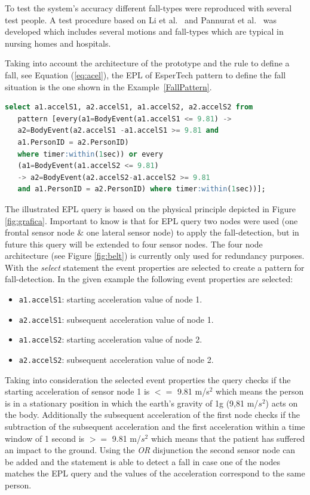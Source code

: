 \documentclass[review]{elsarticle}
\begin{document}
To test the system's accuracy different fall-types were reproduced with several test people. A 
test procedure based on Li et al.~\cite{Li2009} and Pannurat et al.~\cite{Pannurat2014} was developed which includes 
several motions and fall-types which are typical in nursing homes and hospitals.

Taking into account the architecture of the prototype and the rule to define a fall, see Equation (\ref{eq:acel}), 
the EPL of EsperTech pattern to define the fall situation is the one shown in the Example~\ref{FallPattern}.

\begin{lstlisting}[basicstyle=\ttfamily\footnotesize,language=SQL,caption=Fall pattern,label=FallPattern]
  select a1.accelS1, a2.accelS1, a1.accelS2, a2.accelS2 from 
   pattern [every(a1=BodyEvent(a1.accelS1 <= 9.81) -> 
   a2=BodyEvent(a2.accelS1 -a1.accelS1 >= 9.81 and 
   a1.PersonID = a2.PersonID) 
   where timer:within(1sec)) or every 
   (a1=BodyEvent(a1.accelS2 <= 9.81)
   -> a2=BodyEvent(a2.accelS2-a1.accelS2 >= 9.81
   and a1.PersonID = a2.PersonID) where timer:within(1sec))];
 \end{lstlisting}

The illustrated EPL query is based on the physical principle depicted in 
Figure \ref{fig:grafica}. Important to know is that for EPL query two nodes 
were used (one frontal sensor node \& one lateral sensor node) to apply the 
fall-detection, but in future this query will be extended to four sensor nodes. 
The four node architecture (see Figure \ref{fig:belt}) is currently only used 
for redundancy purposes. With the \textit{select} statement the event properties 
are selected to create a pattern for fall-detection. In the given example the
following event properties are selected:

\begin{itemize}
 \item \texttt{a1.accelS1}: starting acceleration value of node 1.
 \item \texttt{a2.accelS1}: subsequent acceleration value of node 1.
 \item \texttt{a1.accelS2}: starting acceleration value of node 2.
 \item \texttt{a2.accelS2}: subsequent acceleration value of node 2.
\end{itemize}

Taking into consideration the selected event properties the query checks if the 
starting acceleration of sensor node 1 is $<=$ 9.81 m/s$^2$ which means the person 
is in a stationary position in which the earth's gravity of 1g (9,81 m/$s^2$) acts 
on the body. Additionally the subsequent acceleration of the first node checks if the 
subtraction of the subsequent acceleration and the first acceleration within a 
time window of 1 second is $>=$ 9.81 m/$s^2$ which means that the patient has 
suffered an impact to the ground. Using the \textit{OR} disjunction the second 
sensor node can be added and the statement is able to detect a fall in case one 
of the nodes matches the EPL query and the values of the acceleration correspond 
to the same person. 
 
\end{document}
